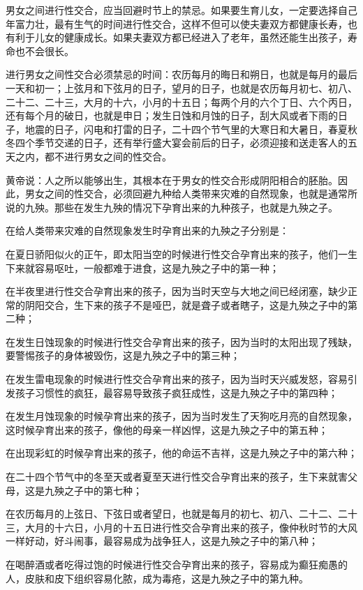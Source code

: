 \documentclass[a4paper,12pt,UTF8,twoside]{ctexbook}
\begin{document}
男女之间进行性交合，应当回避时节上的禁忌。如果要生育儿女，一定要选择自己年富力壮，最有生气的时间进行性交合，这样不但可以使夫妻双方都健康长寿，也有利于儿女的健康成长。如果夫妻双方都已经进入了老年，虽然还能生出孩子，寿命也不会很长。

进行男女之间性交合必须禁忌的时间：农历每月的晦日和朔日，也就是每月的最后一天和初一；上弦月和下弦月的日子，望月的日子，也就是农历每月初七、初八、二十二、二十三，大月的十六，小月的十五日；每两个月的六个丁日、六个丙日，还有每个月的破日，也就是申日；发生日蚀和月蚀的日子，刮大风或者下雨的日子，地震的日子，闪电和打雷的日子，二十四个节气里的大寒日和大暑日，春夏秋冬四个季节交递的日子，还有举行盛大宴会前后的日子，必须迎接和送走客人的五天之内，都不进行男女之间的性交合。

黄帝说：人之所以能够出生，其根本在于男女的性交合形成阴阳相合的胚胎。因此，男女之间的性交合，必须回避九种给人类带来灾难的自然现象，也就是通常所说的九殃。那些在发生九殃的情况下孕育出来的九种孩子，也就是九殃之子。

在给人类带来灾难的自然现象发生时孕育出来的九殃之子分别是：

在夏日骄阳似火的正午，即太阳当空的时候进行性交合孕育出来的孩子，他们一生下来就容易呕吐，一般都难于进食，这是九殃之子中的第一种；

在半夜里进行性交合孕育出来的孩子，因为当时天空与大地之间已经闭塞，缺少正常的阴阳交合，生下来的孩子不是哑巴，就是聋子或者瞎子，这是九殃之子中的第二种；

在发生日蚀现象的时候进行性交合孕育出来的孩子，因为当时的太阳出现了残缺，要警惕孩子的身体被毁伤，这是九殃之子中的第三种；

在发生雷电现象的时候进行性交合孕育出来的孩子，因为当时天兴威发怒，容易引发孩子习惯性的疯狂，最容易导致孩子疯狂成性，这是九殃之子中的第四种；

在发生月蚀现象的时候孕育出来的孩子，因为当时发生了天狗吃月亮的自然现象，这时候孕育出来的孩子，像他的母亲一样凶悍，这是九殃之子中的第五种；

在出现彩虹的时候孕育出来的孩子，他的命运不吉祥，这是九殃之子中的第六种；

在二十四个节气中的冬至天或者夏至天进行性交合孕育出来的孩子，生下来就害父母，这是九殃之子中的第七种；

在农历每月的上弦日、下弦日或者望日，也就是每月的初七、初八、二十二、二十三，大月的十六日，小月的十五日进行性交合孕育出来的孩子，像仲秋时节的大风一样好动，好斗闹事，最容易成为战争狂人，这是九殃之子中的第八种；

在喝醉酒或者吃得过饱的时候进行性交合孕育出来的孩子，容易成为癫狂痴愚的人，皮肤和皮下组织容易化脓，成为毒疮，这是九殃之子中的第九种。
\end{document}
